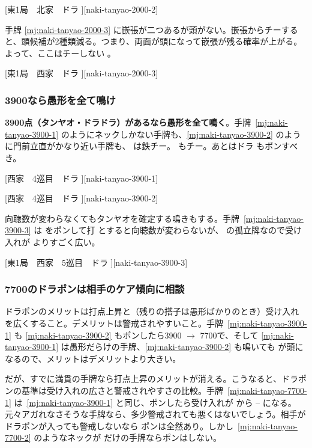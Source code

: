 \documentclass[../nankiru_main.tex]{subfiles}
\begin{document}
[東1局　北家　ドラ ][naki-tanyao-2000-2]

手牌 \ref{mj:naki-tanyao-2000-3} に嵌張が二つあるが頭がない。嵌張からチーすると、頭候補が2種類減る。つまり、両面が頭になって嵌張が残る確率が上がる。よって、ここはチーしない \citep[][p.~55]{hirasawa-naki}。

[東1局　西家　ドラ ][naki-tanyao-2000-3]


\subsubsection*{3900なら愚形を全て鳴け}

\textbf{3900点（タンヤオ・ドラドラ）があるなら愚形を全て鳴く}\citep[][pp.~176--181]{tetsusenryaku}。手牌~\ref{mj:naki-tanyao-3900-1} のようにネックしかない手牌も、\ref{mj:naki-tanyao-3900-2} のように門前立直がかなり近い手牌も、 は鉄チー。 もチー。あとはドラ  もポンすべき。

[西家　4巡目　ドラ ][naki-tanyao-3900-1]

[西家　4巡目　ドラ ][naki-tanyao-3900-2]

向聴数が変わらなくてもタンヤオを確定する鳴きもする\citep[][pp.~127--128]{hirasawa-naki}。手牌~\ref{mj:naki-tanyao-3900-3} は  をポンして打  とすると向聴数が変わらないが、 の孤立牌なので受け入れが  よりすごく広い。

[東1局　西家　5巡目　ドラ ][naki-tanyao-3900-3]


\subsubsection*{7700のドラポンは相手のケア傾向に相談}

ドラポンのメリットは打点上昇と（残りの搭子は愚形ばかりのとき）受け入れを広くすること。デメリットは警戒されやすいこと。手牌~\ref{mj:naki-tanyao-3900-1} も \ref{mj:naki-tanyao-3900-2} もポンしたら3900 $\to$ 7700で、そして \ref{mj:naki-tanyao-3900-1} は愚形だらけの手牌、\ref{mj:naki-tanyao-3900-2} も鳴いても  が頭になるので、メリットはデメリットより大きい。

だが、すでに満貫の手牌なら打点上昇のメリットが消える。こうなると、ドラポンの基準は受け入れの広さと警戒されやすさの比較。手牌~\ref{mj:naki-tanyao-7700-1} は~\ref{mj:naki-tanyao-3900-1} と同じ、ポンしたら受け入れが  から -- になる。元々アガれなさそうな手牌なら、多少警戒されても悪くはないでしょう。相手がドラポンが入っても警戒しないなら  ポンは全然あり。しかし~\ref{mj:naki-tanyao-7700-2} のようなネックが  だけの手牌ならポンはしない\citep[][pp.~188--195]{tetsusenryaku}。
\end{document}

